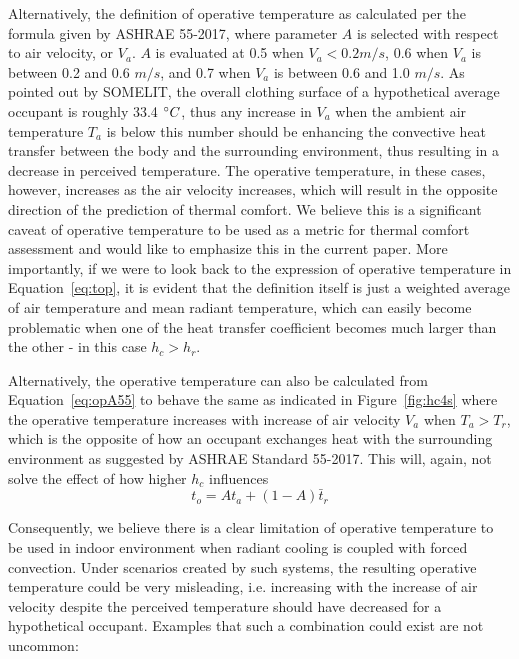     Alternatively, the definition of operative temperature as calculated per the formula given by ASHRAE 55-2017, where parameter $A$ is selected with respect to air velocity, or $V_a$. $A$ is evaluated at 0.5 when $V_a < 0.2m/s$, 0.6 when $V_a$ is between 0.2 and 0.6 $m/s$, and 0.7 when $V_a$ is between 0.6 and 1.0 $m/s$. As pointed out by SOMELIT, the overall clothing surface of a hypothetical average occupant is roughly 33.4 $\degree C$, thus any increase in $V_a$ when the ambient air temperature $T_a$ is below this number should be enhancing the convective heat transfer between the body and the surrounding environment, thus resulting in a decrease in perceived temperature. The operative temperature, in these cases, however, increases as the air velocity increases, which will result in the opposite direction of the prediction of thermal comfort. We believe this is a significant caveat of operative temperature to be used as a metric for thermal comfort assessment and would like to emphasize this in the current paper. More importantly, if we were to look back to the expression of operative temperature in Equation~\ref{eq:top}, it is evident that the definition itself is just a weighted average of air temperature and mean radiant temperature, which can easily become problematic when one of the heat transfer coefficient becomes much larger than the other - in this case $h_c > h_r$. 
    
    Alternatively, the operative temperature can also be calculated from Equation~\ref{eq:opA55} to behave the same as indicated in Figure~\ref{fig:hc4s} where the operative temperature increases with increase of air velocity $V_a$ when $T_a > T_r$, which is the opposite of how an occupant exchanges heat with the surrounding environment as suggested by ASHRAE Standard 55-2017\cite{ansi/ashrae_standard_2017}. This will, again, not solve the effect of how higher $h_c$ influences 
        \begin{equation}
            t_o = At_a + (1-A)\bar t_r\label{eq:opA55}
        \end{equation}
        
    Consequently, we believe there is a clear limitation of operative temperature to be used in indoor environment when radiant cooling is coupled with forced convection. Under scenarios created by such systems, the resulting operative temperature could be very misleading, i.e. increasing with the increase of air velocity despite the perceived temperature should have decreased for a hypothetical occupant. Examples that such a combination could exist are not uncommon: 

